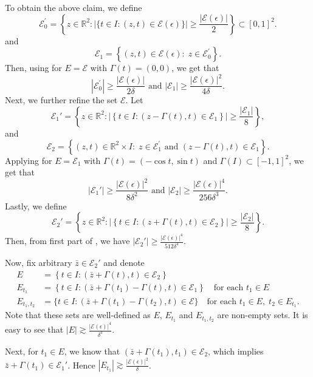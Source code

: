 \documentclass[a4paper,reqno]{amsart}
\theoremstyle{definition}
\theoremstyle{remark}
\numberwithin{equation}{section}
\begin{document}
	To obtain the above claim, we define
	\[\mathcal{E}_{0}^{\prime}=\left\{{z} \in \mathbb{R}^{2}: |\{t\in I:({z},t) \in \mathcal{E}(\epsilon)\}|\geq\frac{|\mathcal{E}(\epsilon)|}{2}\right\}\subset [0,1]^2.\]
	and
	\[\mathcal{E}_{1}=\left\{({z},t) \in \mathcal{E}(\epsilon):\; {z} \in \mathcal{E}_{0}^{\prime}\right\}.\]
	Then, using  for $E=\mathcal{E}$ with $\Gamma(t)=(0,0)$, we get that 
	\[\left|\mathcal{E}_{0}^{\prime}\right|\geq\frac{|\mathcal{E}(\epsilon)|}{2 \delta}\text{ and }\left|\mathcal{E}_{1}\right|\geq\frac{|\mathcal{E}(\epsilon)|^{2}}{4 \delta}.\]
	Next, we further refine the set $\mathcal{E}$.	Let
	\[\mathcal{E}_{1}'=\left\{{z} \in \mathbb{R}^{2}:\left|\left\{t \in I:({z}-\Gamma(t), t) \in \mathcal{E}_{1}\right\}\right| \geq\frac{\left|\mathcal{E}_{1}\right|}{8}\right\},\]
	and
	\[\mathcal{E}_{2}=\left\{({z},t) \in \mathbb{R}^{2} \times I:\; {z} \in \mathcal{E}_{1}^{\prime}\text{ and }({z}-\Gamma(t), t) \in \mathcal{E}_{1}\right\}.\]
	Applying  for $E=\mathcal{E}_1$ with $\Gamma(t)=(-\cos t,\sin t)$ and $\Gamma(I)\subset[-1,1]^2$, we get that
	\[\left|\mathcal{E}_{1}'\right|\geq\frac{|\mathcal{E}(\epsilon)|^2}{8 \delta^2}\text{ and }\left|\mathcal{E}_{2}\right|\geq\frac{|\mathcal{E}(\epsilon)|^{4}}{256\delta^{3}}.\]
	Lastly, we define
	\[\mathcal{E}_{2}'=\left\{{z} \in \mathbb{R}^{2}:\left|\left\{t\in I:({z}+\Gamma(t), t) \in \mathcal{E}_{2}\right\}\right| \geq \frac{\left|\mathcal{E}_{2}\right|}{8}\right\}.\]
	Then, from first part of , we have $|\mathcal{E}_{2}'|\geq\frac{|\mathcal{E}(\epsilon)|^4}{512\delta^4}$.
	
	Now, fix arbitrary ${\bar{z}}\in\mathcal{E}_{2}'$ and denote
	\begin{align*}
		E&=\left\{t \in I:({\bar{z}}+\Gamma(t), t) \in \mathcal{E}_{2}\right\} \\
		E_{t_{1}}&=\left\{t \in I:\left({\bar{z}}+\Gamma\left(t_{1}\right)-\Gamma(t), t\right) \in \mathcal{E}_{1}\right\} \quad\text{for each }t_{1} \in E \\
		E_{t_{1},t_{2}}&=\{t \in I:({\bar{z}}+\Gamma(t_1)-\Gamma(t_2), t)\in \mathcal{E}\} \quad\text{for each }t_{1} \in E,\; t_{2} \in E_{t_{1}}.
	\end{align*}
	Note that these sets are well-defined as $E$, $E_{t_1}$ and $E_{t_1,t_2}$ are non-empty sets. It is easy to see that $|E|\gtrsim\frac{|\mathcal{E}(\epsilon)|^4}{\delta^3}$.
	
	Next, for $t_1\in E$, we know that $({\bar{z}}+\Gamma(t_1),t_1)\in\mathcal{E}_2$, which implies ${\bar{z}}+\Gamma(t_1)\in\mathcal{E}_1'$. Hence $|E_{t_1}|\gtrsim\frac{|\mathcal{E}(\epsilon)|^2}{\delta}$.
	
\end{document}
